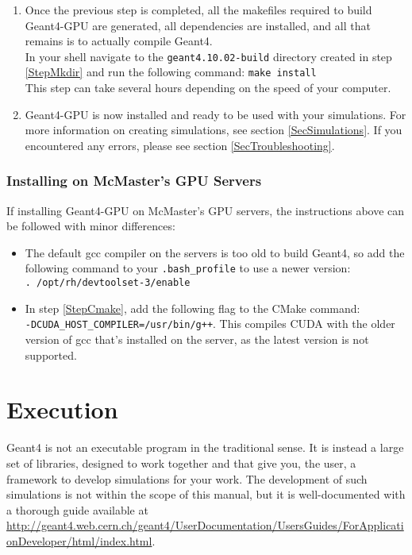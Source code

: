 \documentclass[12pt]{article}
\begin{document}
\begin{enumerate}
\item Once the previous step is completed, all the makefiles required to build Geant4-GPU are generated, all dependencies are installed, and all that remains is to actually compile Geant4.\\

In your shell navigate to the \texttt{geant4.10.02-build} directory created in step \ref{StepMkdir} and run the following command:
\texttt{make install}\\

This step can take several hours depending on the speed of your computer.
\item Geant4-GPU is now installed and ready to be used with your simulations. For more information on creating simulations, see section \ref{SecSimulations}. If you encountered any errors, please see section \ref{SecTroubleshooting}.
\end{enumerate}

\subsubsection{Installing on McMaster's GPU Servers}\label{SecMac}
If installing Geant4-GPU on McMaster's GPU servers, the instructions above can be followed with minor differences:
\begin{itemize}
\item The default gcc compiler on the servers is too old to build Geant4, so add the following command to your \texttt{.bash\_profile} to use a newer version:\\
\texttt{. /opt/rh/devtoolset-3/enable}
\item In step \ref{StepCmake}, add the following flag to the CMake command:\\
\texttt{-DCUDA\_HOST\_COMPILER=/usr/bin/g++}. This compiles CUDA with the older version of gcc that's installed on the server, as the latest version is not supported.
\end{itemize}

\section{Execution} %
Geant4 is not an executable program in the traditional sense. It is instead a large set of libraries, designed to work together and that give you, the user, a framework to develop simulations for your work. The development of such simulations is not within the scope of this manual, but it is well-documented with a thorough guide available at \url{http://geant4.web.cern.ch/geant4/UserDocumentation/UsersGuides/ForApplicationDeveloper/html/index.html}.\\
\end{document}

